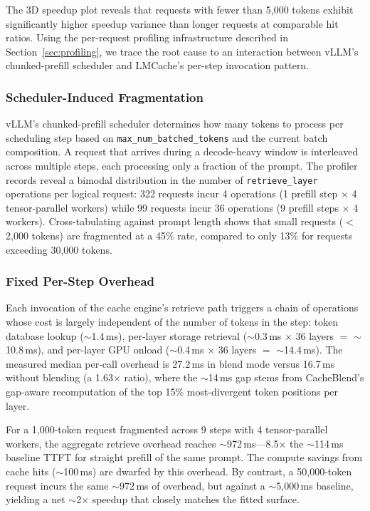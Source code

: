 The 3D speedup plot reveals that requests with fewer than 5{,}000 tokens exhibit significantly higher speedup variance than longer requests at comparable hit ratios. Using the per-request profiling infrastructure described in Section~\ref{sec:profiling}, we trace the root cause to an interaction between vLLM's chunked-prefill scheduler and LMCache's per-step invocation pattern.

\subsubsection{Scheduler-Induced Fragmentation}

vLLM's chunked-prefill scheduler determines how many tokens to process per scheduling step based on \texttt{max\_num\_batched\_tokens} and the current batch composition. A request that arrives during a decode-heavy window is interleaved across multiple steps, each processing only a fraction of the prompt. The profiler records reveal a bimodal distribution in the number of \texttt{retrieve\_layer} operations per logical request: 322 requests incur 4 operations (1 prefill step $\times$ 4 tensor-parallel workers) while 99 requests incur 36 operations (9 prefill steps $\times$ 4 workers). Cross-tabulating against prompt length shows that small requests ($<$2{,}000 tokens) are fragmented at a 45\% rate, compared to only 13\% for requests exceeding 30{,}000 tokens.

\subsubsection{Fixed Per-Step Overhead}

Each invocation of the cache engine's retrieve path triggers a chain of operations whose cost is largely independent of the number of tokens in the step: token database lookup (${\sim}$1.4\,ms), per-layer storage retrieval (${\sim}$0.3\,ms $\times$ 36 layers $=$ ${\sim}$10.8\,ms), and per-layer GPU onload (${\sim}$0.4\,ms $\times$ 36 layers $=$ ${\sim}$14.4\,ms). The measured median per-call overhead is 27.2\,ms in blend mode versus 16.7\,ms without blending (a 1.63$\times$ ratio), where the ${\sim}$14\,ms gap stems from CacheBlend's gap-aware recomputation of the top 15\% most-divergent token positions per layer.

For a 1{,}000-token request fragmented across 9 steps with 4 tensor-parallel workers, the aggregate retrieve overhead reaches ${\sim}$972\,ms---8.5$\times$ the ${\sim}$114\,ms baseline TTFT for straight prefill of the same prompt. The compute savings from cache hits (${\sim}$100\,ms) are dwarfed by this overhead. By contrast, a 50{,}000-token request incurs the same ${\sim}$972\,ms of overhead, but against a ${\sim}$5{,}000\,ms baseline, yielding a net ${\sim}$2$\times$ speedup that closely matches the fitted surface.

